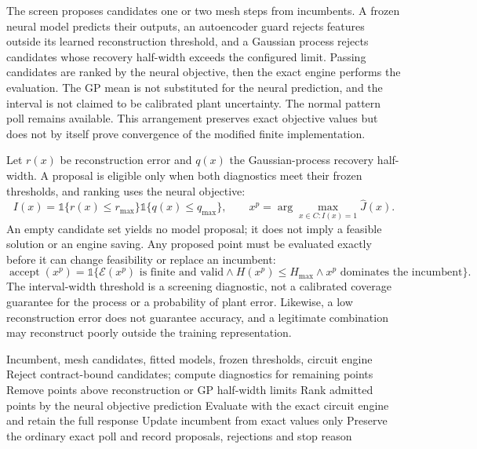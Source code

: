 \documentclass[10pt]{article}
\begin{document}
The screen proposes candidates one or two mesh steps from incumbents. A
frozen neural model predicts their outputs, an autoencoder guard rejects
features outside its learned reconstruction threshold, and a Gaussian
process rejects candidates whose recovery half-width exceeds the
configured limit. Passing candidates are ranked by the neural objective,
then the exact engine performs the evaluation. The GP mean is not
substituted for the neural prediction, and the interval is not claimed
to be calibrated plant uncertainty. The normal pattern poll remains
available. This arrangement preserves exact objective values but does
not by itself prove convergence of the modified finite implementation.

Let \(r(x)\) be reconstruction error and \(q(x)\) the Gaussian-process
recovery half-width. A proposal is eligible only when both diagnostics
meet their frozen thresholds, and ranking uses the neural objective:
\begin{equation}
I(x)=\mathbb{1}\{r(x)\leq r_{\max}\}\mathbb{1}\{q(x)\leq q_{\max}\},
\qquad x^{p}=\arg\max_{x\in C:I(x)=1}\widehat J(x).
\label{eq:oreflow-screen-rule}
\end{equation}
An empty candidate set yields no model proposal; it does not imply a
feasible solution or an engine saving. Any proposed point must be
evaluated exactly before it can change feasibility or replace an
incumbent:
\begin{equation}
\operatorname{accept}(x^p)=\mathbb{1}\{\mathcal E(x^p)\text{ is finite and valid}
\land H(x^p)\leq H_{\max}\land x^p\text{ dominates the incumbent}\}.
\label{eq:oreflow-exact-confirmation}
\end{equation}
The interval-width threshold is a screening diagnostic, not a calibrated
coverage guarantee for the process or a probability of plant error.
Likewise, a low reconstruction error does not guarantee accuracy, and a
legitimate combination may reconstruct poorly outside the training
representation.

\begin{algorithm}
\caption{Screen pattern-search candidates before exact process evaluation}
\label{alg:guarded-search}
\begin{algorithmic}[1]
\Require Incumbent, mesh candidates, fitted models, frozen thresholds, circuit engine
\State Reject contract-bound candidates; compute diagnostics for remaining points
\State Remove points above reconstruction or GP half-width limits
\State Rank admitted points by the neural objective prediction
\State Evaluate with the exact circuit engine and retain the full response
\State Update incumbent from exact values only
\EndIf
\EndFor
\State Preserve the ordinary exact poll and record proposals, rejections and stop reason
\end{algorithmic}
\end{algorithm}
\end{document}
